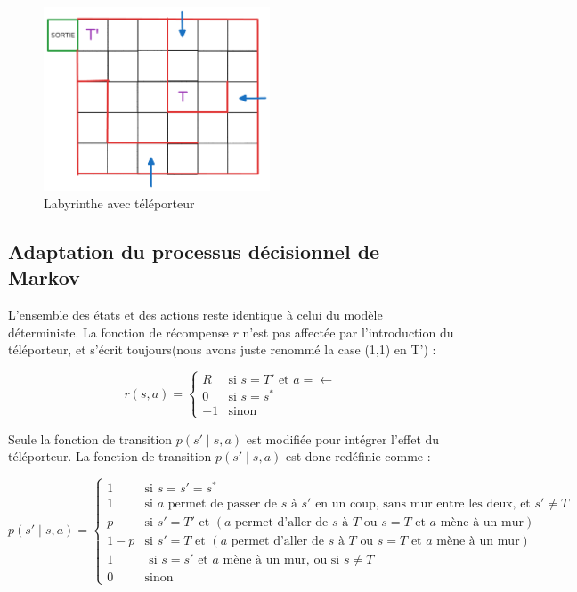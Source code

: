 \documentclass[12pt]{article}
\begin{document}
\begin{figure}[H]
    \centering
    \includegraphics[width=0.6\textwidth]{labyrinthetéléporteur.png}
    \caption{Labyrinthe avec téléporteur}
    \label{fig:labyrinthe_teleporteur}
\end{figure}

\subsection{Adaptation du processus décisionnel de Markov}

L’ensemble des états et des actions reste identique à celui du modèle déterministe. La fonction de récompense \(r\) n’est pas affectée par l’introduction du téléporteur, et s’écrit toujours(nous avons juste renommé la case (1,1) en T') :

\[
r(s, a) =
\begin{cases}
R & \text{si } s = T' \text{ et } a = \leftarrow \\
0 & \text{si } s = s^* \\
-1 & \text{sinon}
\end{cases}
\]


Seule la fonction de transition \(p(s' \mid s, a)\) est modifiée pour intégrer l’effet du téléporteur.
La fonction de transition $p(s' \mid s, a)$ est donc redéfinie comme :

\[
p(s' \mid s, a) = 
\begin{cases}
1 & \text{si } s = s' = s^* \\
1 & \text{si } a \text{ permet de passer de } s \text{ à } s' \text{ en un coup, sans mur entre les deux, et } s' \neq T \\
p & \text{si } s' = T' \text{ et } (a \text{ permet d’aller de } s \text{ à } T \text{ ou } s = T \text{ et } a \text{ mène à un mur}) \\
1 - p & \text{si } s' = T \text{ et } (a \text{ permet d’aller de } s \text{ à } T \text{ ou } s = T \text{ et } a \text{ mène à un mur}) \\
1 & \text{ si } s = s' \text{ et } a \text{ mène à un mur, ou si } s \neq T \\
0 & \text{sinon}
\end{cases}
\]
\end{document}
